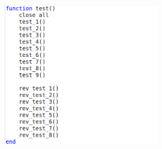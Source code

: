 \documentclass[a4paper, 12pt]{report}
\begin{document}
		\begin{figure}[H]
			\centering
			\includegraphics[width = 0.6\textwidth]{./codes/test_suite.png}
		\end{figure}
\end{document}
